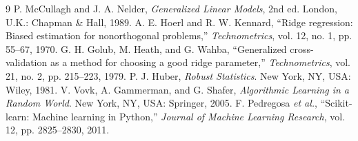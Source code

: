 \documentclass[conference]{IEEEtran}
\begin{document}
\begin{thebibliography}{9}
 P. McCullagh and J. A. Nelder, \emph{Generalized Linear Models}, 2nd ed. London, U.K.: Chapman \& Hall, 1989.
 A. E. Hoerl and R. W. Kennard, ``Ridge regression: Biased estimation for nonorthogonal problems,'' \emph{Technometrics}, vol. 12, no. 1, pp. 55--67, 1970.
 G. H. Golub, M. Heath, and G. Wahba, ``Generalized cross-validation as a method for choosing a good ridge parameter,'' \emph{Technometrics}, vol. 21, no. 2, pp. 215--223, 1979.
 P. J. Huber, \emph{Robust Statistics}. New York, NY, USA: Wiley, 1981.
 V. Vovk, A. Gammerman, and G. Shafer, \emph{Algorithmic Learning in a Random World}. New York, NY, USA: Springer, 2005.
 F. Pedregosa \emph{et al.}, ``Scikit-learn: Machine learning in Python,'' \emph{Journal of Machine Learning Research}, vol. 12, pp. 2825--2830, 2011.
\end{thebibliography}
\end{document}
